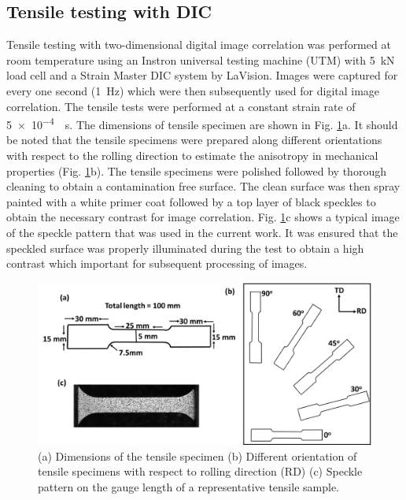 \documentclass[11pt]{article} %
\begin{document}
\subsection{Tensile testing with DIC}
Tensile testing with two-dimensional digital image correlation was performed at room temperature using an Instron universal testing machine (UTM) with \SI{5}{\kilo\newton} load cell and a Strain Master DIC system by LaVision. Images were captured for every one second (\SI{1}{\hertz}) which were then subsequently used for digital image correlation. The tensile tests were performed at a constant strain rate of \SI{5e-4}{\per\second}. The dimensions of tensile specimen are shown in Fig. \ref{fig:dic_specimens}a. It should be noted that the tensile specimens were prepared along different orientations with respect to the rolling direction to estimate the anisotropy in mechanical properties (Fig. \ref{fig:dic_specimens}b). The tensile specimens were polished followed by thorough cleaning to obtain a contamination free surface. The clean surface was then spray painted with a white primer coat followed by a top layer of black speckles to obtain the necessary contrast for image correlation. Fig. \ref{fig:dic_specimens}c shows a typical image of the speckle pattern that was used in the current work. It was ensured that the speckled surface was properly illuminated during the test to obtain a high contrast which important for subsequent processing of images.

\begin{figure}[h]
	\includegraphics{figures/dic_specimens}
	\centering
	\caption{(a) Dimensions of the tensile specimen (b) Different orientation of tensile specimens with respect to rolling direction (RD) (c) Speckle pattern on the gauge length of a representative tensile
 sample.
	\label{fig:dic_specimens}}
\end{figure}
\end{document}

